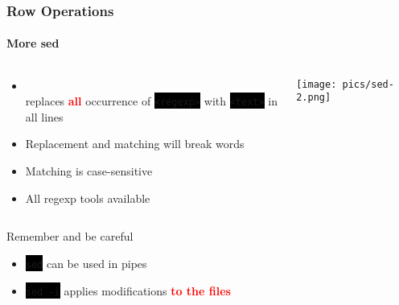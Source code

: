 \documentclass[unknownkeysallowed, 10pt, a4 paper, handout]{beamer}
\newcommand{\focus}[1]{\textbf{\textcolor{red}{#1}}}
\newcommand{\code}[1]{\colorbox{black}{\color{green}\texttt{#1}}}
\newcommand{\codeine}[1]{\colorbox{black}{\color{green}\BUseVerbatim{#1}}}
\begin{document}
\begin{frame}[fragile=singleslide]
  \frametitle{Row Operations}
  \framesubtitle{More sed}

  \begin{columns}
    \begin{column}{0.70\textwidth}
      \begin{itemize}
        \begin{SaveVerbatim}{myverb}
sed 's/<regexp>/<text>/g' <files>
        \end{SaveVerbatim}
        \item \codeine{myverb} \\
          replaces \focus{all} occurrence of \code{<regexp>} with
          \code{<text>} in all lines
      \end{itemize}
      \begin{exampleblock}{}
        \begin{itemize}
          \item Replacement and matching will break words
          \item Matching is case-sensitive
          \item All regexp tools available
        \end{itemize}
      \end{exampleblock}
    \end{column}
    \begin{column}{0.30\textwidth}
      \texttt{[image: pics/sed-2.png]}
    \end{column}
  \end{columns}

  \begin{alertblock}{Remember and be careful}
    \begin{itemize}
      \item \code{sed} can be used in pipes
      \item \code{sed -i} applies modifications \focus{to the files}
    \end{itemize}
  \end{alertblock}
\end{frame}
\end{document}
